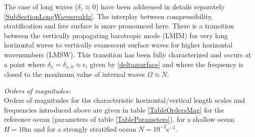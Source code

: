 The case of long waves ($\delta_z \approx 0$) have been addressed in details separately \ref{SubSectionLongWavesrealdz}. The interplay between compressibility, stratification and free surface is more pronounced here. There is a transition between the vertically propagating barotropic mode (LMIM) for very long horizontal waves to vertically evanescent surface waves for higher horizontal wavenumbers (LMSW). This transition has been fully characterized and occurs at a point where $\delta_x=\delta_{x,0}\approx \epsilon_i$ given by \ref{deltazsurface} and where the frequency is closed to the maximum value of internal waves $\Omega \approx N$.

\textit{Orders of magnitudes:}\\
 Orders of magnitudes for the characteristic horizontal/vertical length scales and frequencies introduced above are given in table \ref{TableOrdersMag} for the reference ocean (parameters of table \ref{TableParameters}), for a shallow ocean $H=10$m and for a strongly stratified ocean $N=10^{-2}$s$^{-1}$.
 \newpage
